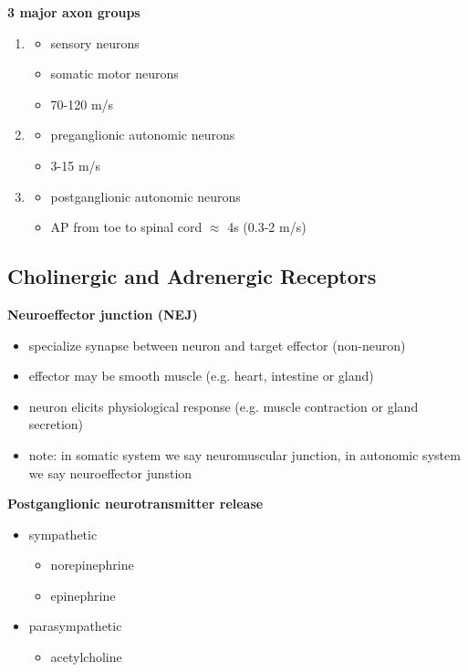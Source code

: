 \documentclass[11pt,fleqn]{book}
\begin{document}
\textbf{3 major axon groups}
\begin{enumerate}
    \item \begin{itemize}
        \item sensory neurons
        \item somatic motor neurons
        \item 70-120 m/s
    \end{itemize}
    \item \begin{itemize}
        \item preganglionic autonomic neurons
        \item 3-15 m/s
    \end{itemize}
    \item \begin{itemize}
        \item postganglionic autonomic neurons
        \item AP from toe to spinal cord $\approx$ 4s (0.3-2 m/s)
    \end{itemize}
\end{enumerate}

\subsection{Cholinergic and Adrenergic Receptors}
\textbf{Neuroeffector junction (NEJ)}
\begin{itemize}
    \item specialize synapse between neuron and target effector (non-neuron)
    \item effector may be smooth muscle (e.g. heart, intestine or gland)
    \item neuron elicits physiological response (e.g. muscle contraction or gland secretion)
    \item note: in somatic system we say neuromuscular junction, in autonomic system we say neuroeffector junstion
\end{itemize}

\textbf{Postganglionic neurotransmitter release}
\begin{itemize}
    \item sympathetic
    \begin{itemize}
        \item norepinephrine
        \item epinephrine
    \end{itemize}
    \item parasympathetic
    \begin{itemize}
        \item acetylcholine
    \end{itemize}
\end{itemize}
\end{document}
